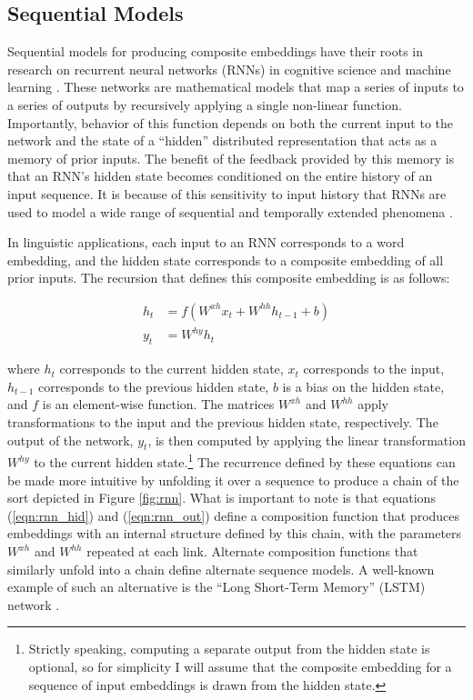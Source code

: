 \subsection{Sequential Models}

Sequential models for producing composite embeddings have their roots in research on recurrent neural networks (RNNs) in cognitive science and machine learning \citep{Elman:1990,Elman:1991}. These networks are mathematical models that map a series of inputs to a series of outputs by recursively applying a single non-linear function. Importantly, behavior of this function depends on both the current input to the network and the state of a ``hidden'' distributed representation that acts as a memory of prior inputs. The benefit of the feedback provided by this memory is that an RNN's hidden state becomes conditioned on the entire history of an input sequence. It is because of this sensitivity to input history that RNNs are used to model a wide range of sequential and temporally extended phenomena \citep{Sutskever:2014}. 

In linguistic applications, each input to an RNN corresponds to a word embedding, and the hidden state corresponds to a composite embedding of all prior inputs. The recursion that defines this composite embedding is as follows:

\begin{align}
\label{eqn:rnn_hid}
h_t &= f (W^{xh} x_t + W^{hh} h_{t-1} + b) \\ 
\label{eqn:rnn_out}
y_t &= W^{hy} h_t 
\end{align}

\noindent
where $h_t$ corresponds to the current hidden state, $x_t$ corresponds to the input, $h_{t-1}$ corresponds to the previous hidden state, $b$ is a bias on the hidden state, and $f$ is an element-wise function. The matrices $W^{xh}$ and $W^{hh}$ apply transformations to the input and the previous hidden state, respectively. The output of the network, $y_t$, is then computed by applying the linear transformation $W^{hy}$ to the current hidden state.\footnote{Strictly speaking, computing a separate output from the hidden state is optional, so for simplicity I will assume that the composite embedding for a sequence of input embeddings is drawn from the hidden state.} The recurrence defined by these equations can be made more intuitive by unfolding it over a sequence to produce a chain of the sort depicted in Figure \ref{fig:rnn}. What is important to note is that equations (\ref{eqn:rnn_hid}) and (\ref{eqn:rnn_out}) define a composition function that produces embeddings with an internal structure defined by this chain, with the parameters $W^{xh}$ and $W^{hh}$ repeated at each link. Alternate composition functions that similarly unfold into a chain define alternate sequence models. A well-known example of such an alternative is the ``Long Short-Term Memory'' (LSTM) network \citep{Sutskever:2014}. 

